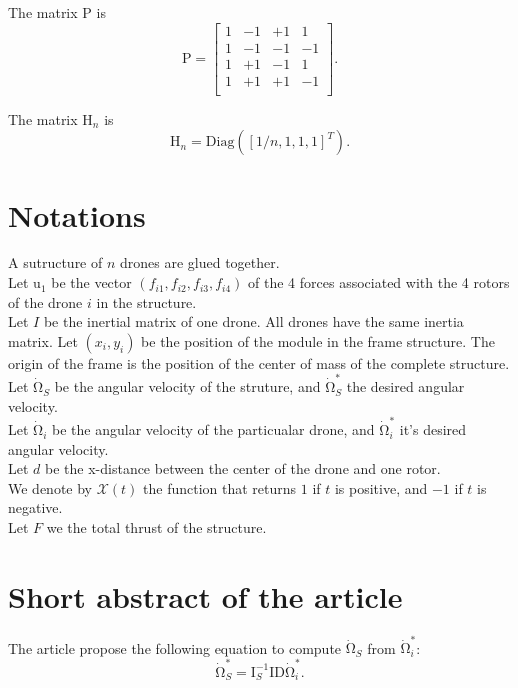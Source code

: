 \documentclass[a4paper]{article}
\newcommand{\UB}[1]{ \bm{\mathrm{#1}} }
\begin{document}
The matrix $\UB{P}$ is
$$
\UB{P}
=
\left[
\begin{array}{cccc}
1 & -1 & +1 &  1  \\
1 & -1 & -1 & -1  \\
1 & +1 & -1 &  1  \\
1 & +1 & +1 & -1  \\
\end{array}
\right].
$$

The matrix $\UB{H}_n$ is
$$
\UB{H}_n = \mathrm{Diag}( [1/n, 1, 1, 1]^T ).
$$

\section{Notations}

A sutructure of $n$ drones are glued together.\\

Let $\UB{u}_1$ be the vector $(f_{i1}, f_{i2}, f_{i3}, f_{i4})$ of the 4 forces associated with the 4 rotors of the drone $i$ in the structure.\\

Let $I$ be the inertial matrix of one drone. All drones have the same inertia matrix.
Let $(x_i,y_i)$ be the position of the module in the frame structure.
The origin of the frame is the position of the center of mass of the complete structure.\\

Let $\dot{\UB{\Omega}}_S$ be the angular velocity of the struture, and $\dot{\UB{\Omega}}_S^*$
the desired angular velocity. \\

Let $\dot{\UB{\Omega}}_i$ be the angular velocity of the particualar drone, and $\dot{\UB{\Omega}}_i^*$
it's desired angular velocity. \\

Let $d$ be the x-distance between the center of the drone and one rotor.\\

We denote by $\mathcal{X}(t)$ the function that returns $1$ if $t$ is positive, and $-1$ if $t$ is negative.\\

Let $F$ we the total thrust of the structure.

\section{Short abstract of the article}

The article propose the following equation to compute 
$\dot{\UB{\Omega}}_S$ from $\dot{\UB{\Omega}}_i^*$: 
$$
\dot{\UB{\Omega}}_S^*
=
\UB{I}_S^{-1} \UB{I} \UB{D} \dot{\UB{\Omega}}_i^*
.
$$
\end{document}
